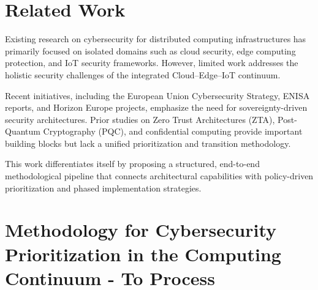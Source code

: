 \documentclass{ieeeaccess}
\begin{document}
 
\section{Related Work}

Existing research on cybersecurity for distributed computing infrastructures has primarily focused on isolated domains such as cloud security, edge computing protection, and IoT security frameworks. However, limited work addresses the holistic security challenges of the integrated Cloud--Edge--IoT continuum.

Recent initiatives, including the European Union Cybersecurity Strategy, ENISA reports, and Horizon Europe projects, emphasize the need for sovereignty-driven security architectures. Prior studies on Zero Trust Architectures (ZTA), Post-Quantum Cryptography (PQC), and confidential computing provide important building blocks but lack a unified prioritization and transition methodology.

This work differentiates itself by proposing a structured, end-to-end methodological pipeline that connects architectural capabilities with policy-driven prioritization and phased implementation strategies.

\newpage


\pagebreak

\section{Methodology for Cybersecurity Prioritization in the Computing Continuum - To Process}
\label{sec:methodology}
\end{document}
